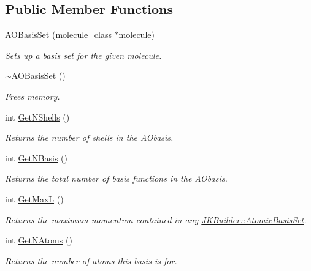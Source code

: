 \subsection*{Public Member Functions}
\begin{DoxyCompactItemize}
\item 
\hyperlink{classJKBuilder_1_1AOBasisSet_ae37ea5df793e15317b741ddef3065f3a}{AOBasisSet} (\hyperlink{classJKBuilder_1_1molecule__class}{molecule\_\-class} $\ast$molecule)
\begin{DoxyCompactList}\small\item\em Sets up a basis set for the given molecule. \item\end{DoxyCompactList}\item 
\hyperlink{classJKBuilder_1_1AOBasisSet_addb5212a040850c3a3816eb2ef9c2483}{$\sim$AOBasisSet} ()
\begin{DoxyCompactList}\small\item\em Frees memory. \item\end{DoxyCompactList}\item 
int \hyperlink{classJKBuilder_1_1AOBasisSet_aa62be7e63d0f2b5828ab72cec3ce8590}{GetNShells} ()
\begin{DoxyCompactList}\small\item\em Returns the number of shells in the AObasis. \item\end{DoxyCompactList}\item 
int \hyperlink{classJKBuilder_1_1AOBasisSet_a297c144fb990284ac5973c99cdd55f91}{GetNBasis} ()
\begin{DoxyCompactList}\small\item\em Returns the total number of basis functions in the AObasis. \item\end{DoxyCompactList}\item 
int \hyperlink{classJKBuilder_1_1AOBasisSet_af6694a93cc5d86a8f3cd1aa984a0cdc3}{GetMaxL} ()
\begin{DoxyCompactList}\small\item\em Returns the maximum momentum contained in any \hyperlink{classJKBuilder_1_1AtomicBasisSet}{JKBuilder::AtomicBasisSet}. \item\end{DoxyCompactList}\item 
int \hyperlink{classJKBuilder_1_1AOBasisSet_a6a6c8b94fb293123b918605d0507ebbf}{GetNAtoms} ()
\begin{DoxyCompactList}\small\item\em Returns the number of atoms this basis is for. \item\end{DoxyCompactList}\item 

\end{DoxyCompactItemize}
